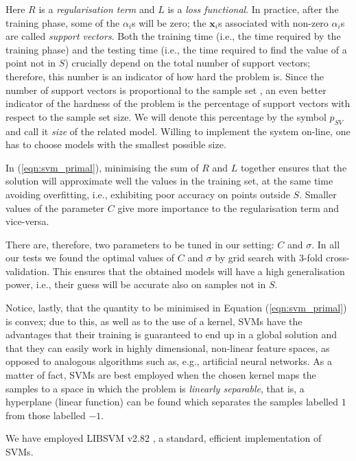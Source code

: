 \documentclass[jou,a4paper,notxfonts]{apa}
\def\xx{\mathbf{x}}
\begin{document}
Here $R$ is a \emph{regularisation term} and $L$ is a \emph{loss
functional}. In practice, after the training phase, some of the
$\alpha_i$s will be zero; the $\xx_i$s associated with non-zero
$\alpha_i$s are called \emph{support vectors}. Both the training time
(i.e., the time required by the training phase) and the testing time
(i.e., the time required to find the value of a point not in $S$)
crucially depend on the total number of support vectors; therefore,
this number is an indicator of how hard the problem is. Since the
number of support vectors is proportional to the sample set
\cite{Steinwart03}, an even better indicator of the hardness of the
problem is the percentage of support vectors with respect to the
sample set size. We will denote this percentage by the symbol $p_{SV}$
and call it \emph{size} of the related model. Willing to implement the
system on-line, one has to choose models with the smallest possible
size.

In (\ref{eqn:svm_primal}), minimising the sum of $R$ and $L$ together
ensures that the solution will approximate well the values in the
training set, at the same time avoiding overfitting, i.e., exhibiting
poor accuracy on points outside $S$. Smaller values of the parameter
$C$ give more importance to the regularisation term and vice-versa.

There are, therefore, two parameters to be tuned in our setting: $C$
and $\sigma$. In all our tests we found the optimal values of $C$ and
$\sigma$ by grid search with $3$-fold cross-validation. This ensures
that the obtained models will have a high generalisation power, i.e.,
their guess will be accurate also on samples not in $S$.

Notice, lastly, that the quantity to be minimised in Equation
(\ref{eqn:svm_primal}) is convex; due to this, as well as to the use
of a kernel, SVMs have the advantages that their training is
guaranteed to end up in a global solution and that they can easily
work in highly dimensional, non-linear feature spaces, as opposed to
analogous algorithms such as, e.g., artificial neural networks. As a
matter of fact, SVMs are best employed when the chosen kernel maps the
samples to a space in which the problem is \emph{linearly separable},
that is, a hyperplane (linear function) can be found which separates
the samples labelled $1$ from those labelled $-1$.

We have employed LIBSVM v2.82 \cite{ChangL01}, a standard, efficient
implementation of SVMs.
\end{document}
